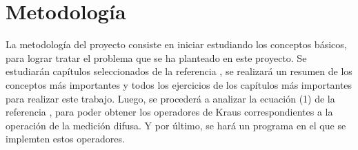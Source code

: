 \section{Metodología}


La metodología del proyecto consiste en iniciar estudiando los conceptos básicos, para lograr tratar el problema que se ha planteado en este proyecto. Se estudiarán capítulos seleccionados de la referencia \cite{nielsen_chuang_2010}, se realizará un resumen de los conceptos más importantes y  todos los ejercicios de los capítulos más importantes para realizar este trabajo. Luego, se procederá a analizar la ecuación (1) de la referencia \cite{Pineda_2021}, para poder obtener los operadores de Kraus correspondientes a la operación de la medición difusa. Y por último, se hará un programa en el que se implemten estos operadores.